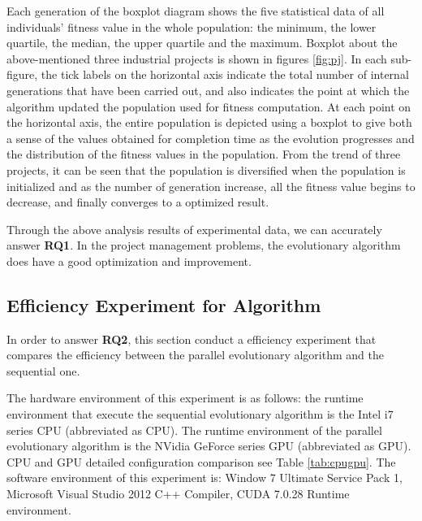 Each generation of the boxplot diagram shows the five statistical data of all
individuals' fitness value in the whole population: the minimum, the lower
quartile, the median, the upper quartile and the maximum. Boxplot about the
above-mentioned three industrial projects is shown in figures \ref{fig:pj}.  In
each sub-figure, the tick labels on the horizontal axis indicate the total
number of internal generations that have been carried out, and also indicates
the point at which the algorithm updated the population used for fitness
computation. At each point on the horizontal axis, the entire population is
depicted using a boxplot to give both a sense of the values obtained for
completion time as the evolution progresses and the distribution of the fitness
values in the population. From the trend of three projects, it can be seen that
the population is diversified when the population is initialized and as the
number of generation increase, all the fitness value begins to decrease, and
finally converges to a optimized result.


Through the above analysis results of experimental data, we can accurately
answer \textbf{RQ1}. In the project management problems, the evolutionary
algorithm does have a good optimization and improvement.


\subsection{Efficiency Experiment for Algorithm}
%
In order to answer \textbf{RQ2}, this section conduct a efficiency experiment
that compares the efficiency between the parallel evolutionary algorithm and the
sequential one.

The hardware environment of this experiment is as follows: the runtime
environment that execute the sequential evolutionary algorithm is the Intel i7
series CPU (abbreviated as CPU). The runtime environment of the parallel
evolutionary algorithm is the NVidia GeForce series GPU (abbreviated as GPU).
CPU and GPU detailed configuration comparison see Table \ref{tab:cpugpu}. The
software environment of this experiment is: Window 7 Ultimate Service Pack 1,
Microsoft Visual Studio 2012 C++ Compiler, CUDA 7.0.28 Runtime environment.



